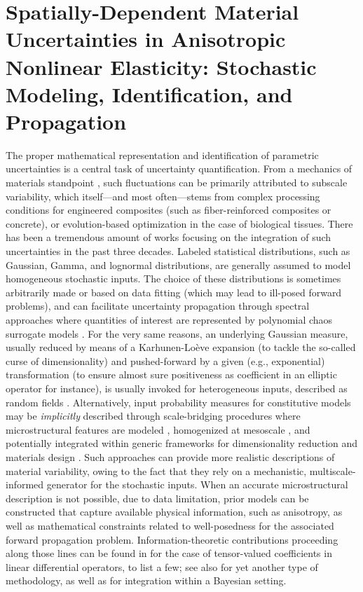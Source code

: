 \chapter{Spatially-Dependent Material Uncertainties in Anisotropic Nonlinear Elasticity: Stochastic Modeling, Identification, and Propagation}
\label{chap:artery}

The proper mathematical representation and identification of parametric uncertainties is a central task of uncertainty quantification. From a mechanics of materials standpoint \cite{GUILLEMINOT2020385}, such fluctuations can be primarily attributed to subscale variability, which itself---and most often---stems from complex processing conditions for engineered composites (such as fiber-reinforced composites or concrete), or evolution-based optimization in the case of biological tissues. There has been a tremendous amount of works focusing on the integration of such uncertainties in the past three decades. Labeled statistical distributions, such as Gaussian, Gamma, and lognormal distributions, are generally assumed to model homogeneous stochastic inputs. The choice of these distributions is sometimes arbitrarily made or based on data fitting (which may lead to ill-posed forward problems), and can facilitate uncertainty propagation through spectral approaches \cite{Ghanem1991, OLM, Ghanem2017} where quantities of interest are represented by polynomial chaos surrogate models \cite{Wiener,Cameron,Xiu2002,Soize2004}. For the very same reasons, an underlying Gaussian measure, usually reduced by means of a Karhunen-Lo\`{e}ve expansion (to tackle the so-called curse of dimensionality) and pushed-forward by a given (e.g., exponential) transformation (to ensure almost sure positiveness as coefficient in an elliptic operator for instance), is usually invoked for heterogeneous inputs, described as random fields \cite{Ghanem1991,Ghanem2017}. Alternatively, input probability measures for constitutive models may be \textit{implicitly} described through scale-bridging procedures where microstructural features are modeled \cite{Sobczyk,Torquato}, homogenized at mesoscale \cite{OstojaBook, ostoja1998, baxter2001a, baxter2001b, STEFANOU2017319}, and potentially integrated within generic frameworks for dimensionality reduction \cite{BESSA2017633} and materials design \cite{Yin2009}. Such approaches can provide more realistic descriptions of material variability, owing to the fact that they rely on a mechanistic, multiscale-informed generator for the stochastic inputs. When an accurate microstructural description is not possible, due to data limitation, prior models can be constructed that capture available physical information, such as anisotropy, as well as mathematical constraints related to well-posedness for the associated forward propagation problem. Information-theoretic contributions proceeding along those lines can be found in \cite{Soize2006,Guilleminot-IJNME-2017,Guilleminot-SIAM-2013,STABER2017399} for the case of tensor-valued coefficients in linear differential operators, to list a few; see also \cite{Grigoriu2016} for yet another type of methodology, as well as \cite{SOIZE2011} for integration within a Bayesian setting.

